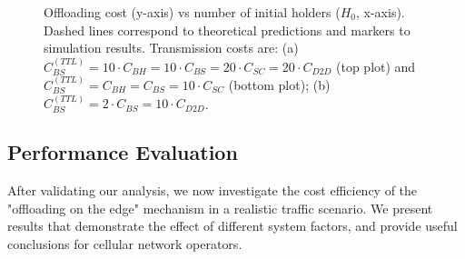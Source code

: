\documentclass[10pt,conference,letterpaper]{IEEEtran}
\begin{document}
\begin{figure}
\caption{Offloading cost (y-axis) vs number of initial holders ($H_{0}$, x-axis). Dashed lines correspond to theoretical predictions and markers to simulation results. Transmission costs are: (a) $C_{BS}^{(TTL)}=10\cdot C_{BH}=10\cdot C_{BS}=20\cdot C_{SC}=20\cdot C_{D2D}$ (top plot) and $C_{BS}^{(TTL)}= C_{BH}= C_{BS}=10\cdot C_{SC}$ (bottom plot); (b) $C_{BS}^{(TTL)}=2\cdot C_{BS}=10\cdot C_{D2D}$.}
\label{fig:cost-single}
\end{figure}

\subsection{Performance Evaluation}\label{sec:simulation-cost-efficiency}
After validating our analysis, we now investigate the cost efficiency of the "offloading on the edge" mechanism in a realistic traffic scenario. We present results that demonstrate the effect of different system factors, and provide useful conclusions for cellular network operators.
\end{document}
